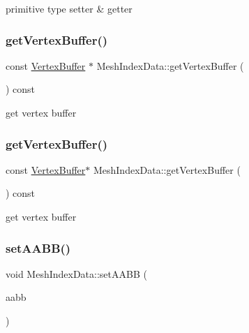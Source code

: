 primitive type setter \& getter \mbox{\label{classMeshIndexData_abc2bce53ba2a672d1b5919a144e13c71}} 
\subsubsection{\texorpdfstring{get\+Vertex\+Buffer()}{getVertexBuffer()}\hspace{0.1cm}{\footnotesize\ttfamily [1/2]}}
{\footnotesize\ttfamily const \hyperlink{classVertexBuffer}{Vertex\+Buffer} $\ast$ Mesh\+Index\+Data\+::get\+Vertex\+Buffer (\begin{DoxyParamCaption}{ }\end{DoxyParamCaption}) const}

get vertex buffer \mbox{\label{classMeshIndexData_a93a8b240d99675e7746333894baa2221}} 
\subsubsection{\texorpdfstring{get\+Vertex\+Buffer()}{getVertexBuffer()}\hspace{0.1cm}{\footnotesize\ttfamily [2/2]}}
{\footnotesize\ttfamily const \hyperlink{classVertexBuffer}{Vertex\+Buffer}$\ast$ Mesh\+Index\+Data\+::get\+Vertex\+Buffer (\begin{DoxyParamCaption}{ }\end{DoxyParamCaption}) const}

get vertex buffer \mbox{\label{classMeshIndexData_a20756e29720a84945cae48decb15c7fa}} 
\subsubsection{\texorpdfstring{set\+A\+A\+B\+B()}{setAABB()}\hspace{0.1cm}{\footnotesize\ttfamily [1/2]}}
{\footnotesize\ttfamily void Mesh\+Index\+Data\+::set\+A\+A\+BB (\begin{DoxyParamCaption}\item[{const \hyperlink{classAABB}{A\+A\+BB} \&}]{aabb }\end{DoxyParamCaption})\hspace{0.3cm}{\ttfamily [inline]}}


